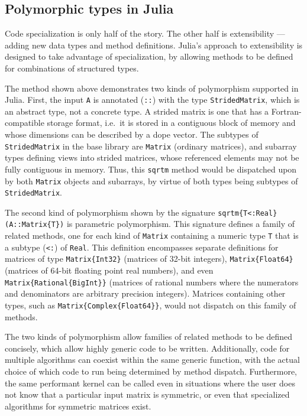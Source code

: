 \subsection{Polymorphic types in Julia}

Code specialization is only half of the story.
The other half is extensibility --- adding new data types and
method definitions.
Julia's approach to extensibility is designed to take advantage of
specialization, by allowing methods to be defined for combinations
of structured types.

The method shown above demonstrates two kinds of polymorphism supported in
Julia. First, the input \lstinline|A| is annotated (\lstinline|::|) with the
type \lstinline|StridedMatrix|, which is an abstract type, not a concrete type.
A strided matrix is one that has a Fortran-compatible storage format, i.e.\ it
is stored in a contiguous block of memory and whose dimensions can be described
by a dope vector. The subtypes of \lstinline|StridedMatrix| in the base
library are \lstinline|Matrix| (ordinary matrices), and subarray types defining
views into strided matrices, whose referenced elements may not be fully
contiguous in memory. Thus, this \lstinline|sqrtm| method would be
dispatched upon by both \lstinline|Matrix| objects and subarrays, by virtue of
both types being subtypes of \lstinline|StridedMatrix|.

The second kind of polymorphism shown by the signature
\lstinline|sqrtm{T<:Real}(A::Matrix{T})| is parametric polymorphism. This
signature defines a family of related methods, one for each kind of
\lstinline|Matrix| containing a numeric type \lstinline|T| that is a subtype
(\lstinline|<:|) of \lstinline|Real|. This definition encompasses separate
definitions for matrices of type \lstinline|Matrix{Int32}| (matrices of 32-bit
integers), \lstinline|Matrix{Float64}| (matrices of 64-bit floating point real
numbers), and even \lstinline|Matrix{Rational{BigInt}}| (matrices of rational
numbers where the numerators and denominators are arbitrary precision
integers). Matrices containing other types, such as
\lstinline|Matrix{Complex{Float64}}|, would not dispatch on this family of methods.

The two kinds of polymorphism allow families of related methods to be defined
concisely, which allow highly generic code to be written. Additionally, code for
multiple algorithms can coexist within the same generic function, with the actual
choice of which code to run being determined by method dispatch. Furthermore,
the same performant kernel can be called even in situations where the user does
not know that a particular input matrix is symmetric, or even that specialized
algorithms for symmetric matrices exist.

